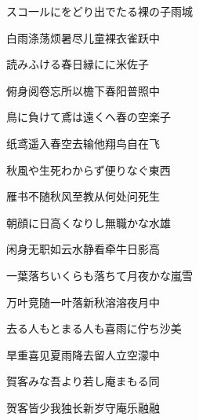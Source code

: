 \begin{haiku}
    {\FH スコ一ルにをどり出でたる裸の子}\hfill{\FH 雨城}

    {\FK 白雨涤荡烦暑尽儿童裸衣雀跃中}
\end{haiku}

\begin{haiku}
    {\FH 読みふける春日縁にに}\hfill{\FH 米佐子}

    {\FK 俯身阅卷忘所以檐下春阳普照中}
\end{haiku}

\begin{haiku}
    {\FH 鳥に負けて鳶は遠くへ春の空}\hfill{\FH 楽子}

    {\FK 纸鸢遥入春空去输他翔鸟自在飞}
\end{haiku}

\begin{haiku}
    {\FH 秋風や生死わからず便りなぐ}\hfill{\FH 東西}

    {\FK 雁书不随秋风至教从何处问死生}
\end{haiku}

\begin{haiku}
    {\FH 朝顔に日高くなりし無職かな}\hfill{\FH 水雄}

    {\FK 闲身无职如云水静看牵牛日影高}
\end{haiku}

\begin{haiku}
    {\FH 一葉落ちいくらも落ちて月夜かな}\hfill{\FH 嵐雪}

    {\FK 万叶竞随一叶落新秋溶溶夜月中}
\end{haiku}

\begin{haiku}
    {\FH 去る人もとまる人も喜雨に佇ち}\hfill{\FH 沙美}

    {\FK 旱重喜见夏雨降去留人立空濛中}
\end{haiku}

\begin{haiku}
    {\FH 賀客みな吾より若し庵まもる}\hfill{\FH 同}

    {\FK 贺客皆少我独长新岁守庵乐融融}
\end{haiku}
